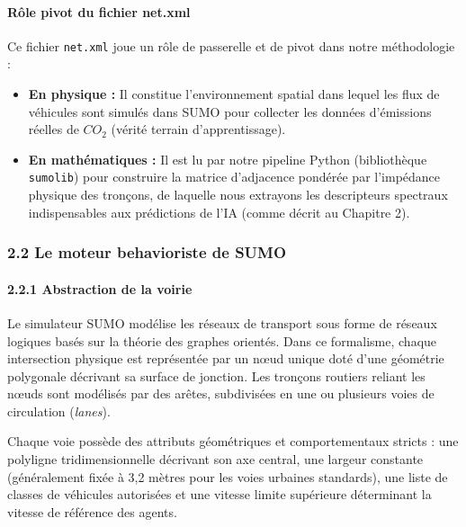 \documentclass[10pt, a4paper]{article}
\providecommand{\tightlist}{}
\begin{document}
\paragraph{Rôle pivot du fichier
net.xml}\label{ruxf4le-pivot-du-fichier-net.xml}

Ce fichier \texttt{net.xml} joue un rôle de passerelle et de pivot dans
notre méthodologie :

\begin{itemize}
\tightlist
\item
  \textbf{En physique :} Il constitue l'environnement spatial dans
  lequel les flux de véhicules sont simulés dans SUMO pour collecter les
  données d'émissions réelles de \(CO_2\) (vérité terrain
  d'apprentissage).
\item
  \textbf{En mathématiques :} Il est lu par notre pipeline Python
  (bibliothèque \texttt{sumolib}) pour construire la matrice d'adjacence
  pondérée par l'impédance physique des tronçons, de laquelle nous
  extrayons les descripteurs spectraux indispensables aux prédictions de
  l'IA (comme décrit au Chapitre 2).
\end{itemize}

\subsubsection{2.2 Le moteur behavioriste de
SUMO}\label{le-moteur-behavioriste-de-sumo}

\paragraph{2.2.1 Abstraction de la
voirie}\label{abstraction-de-la-voirie}

Le simulateur SUMO modélise les réseaux de transport sous forme de
réseaux logiques basés sur la théorie des graphes orientés. Dans ce
formalisme, chaque intersection physique est représentée par un nœud
unique doté d'une géométrie polygonale décrivant sa surface de jonction.
Les tronçons routiers reliant les nœuds sont modélisés par des arêtes,
subdivisées en une ou plusieurs voies de circulation (\emph{lanes}).

Chaque voie possède des attributs géométriques et comportementaux
stricts : une polyligne tridimensionnelle décrivant son axe central, une
largeur constante (généralement fixée à 3,2 mètres pour les voies
urbaines standards), une liste de classes de véhicules autorisées et une
vitesse limite supérieure déterminant la vitesse de référence des
agents.
\end{document}

